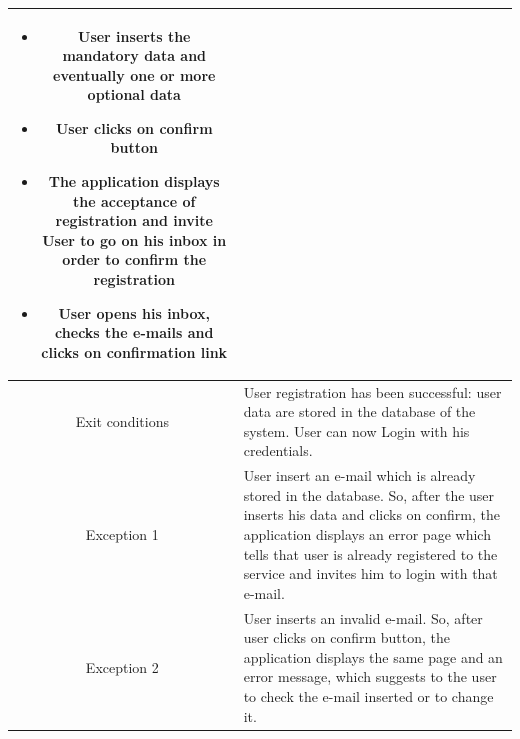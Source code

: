 \documentclass[table, 12pt]{article}
\begin{document}
\begin{longtable}{ | c | p{10cm} | }
\begin{itemize}[nosep,after=\strut]
        \item User inserts the mandatory data and eventually one or more optional data
        \item User clicks on confirm button
        \item The application displays the acceptance of registration and invite User to go on his inbox in order to confirm the registration
        \item User opens his inbox, checks the e-mails and clicks on confirmation link
    \end{itemize}                                                                                                                                                                                                                                             \\
    \hline
    Exit conditions  & User registration has been successful: user data are stored in the database of the system. User can now Login with his credentials.                                                                                                                                    \\
    \hline
    \hline
    Exception 1      & User insert an e-mail which is already stored in the database. So, after the user inserts his data and clicks on confirm, the application displays an error page which tells that user is already registered to the service and invites him to login with that e-mail. \\
    \hline
    Exception 2      & User inserts an invalid e-mail. So, after user clicks on confirm button, the application displays the same page and an error message, which suggests to the user to check the e-mail inserted or to change it.                                                         \\
    \hline
\end{longtable}
\end{document}
